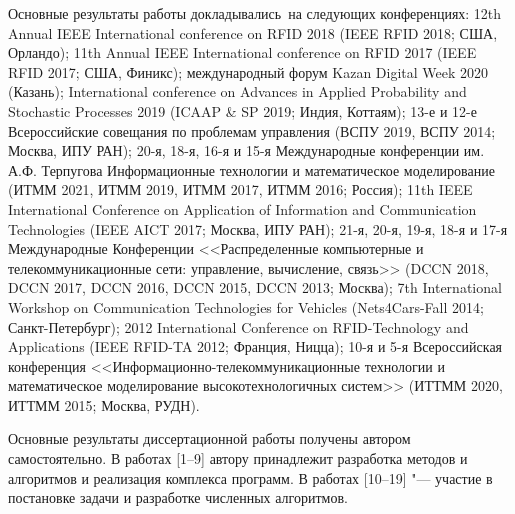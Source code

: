 {\probation}
Основные результаты работы докладывались~на следующих конференциях: 12th Annual IEEE International conference on RFID 2018 (IEEE RFID 2018; США, Орландо); 11th Annual IEEE International conference on RFID 2017 (IEEE RFID 2017; США, Финикс); международный форум Kazan Digital Week 2020 (Казань); International conference on Advances in Applied Probability and Stochastic Processes 2019 (ICAAP \& SP 2019; Индия, Коттаям); 13-е и 12-е Всероссийские совещания по проблемам управления (ВСПУ 2019, ВСПУ 2014; Москва, ИПУ РАН); 20-я, 18-я, 16-я и 15-я Международные конференции им. А.Ф. Терпугова Информационные технологии и математическое моделирование (ИТММ 2021, ИТММ 2019, ИТММ 2017, ИТММ 2016; Россия); 11th IEEE International Conference on Application of Information and Communication Technologies (IEEE AICT 2017; Москва, ИПУ РАН); 21-я, 20-я, 19-я, 18-я и 17-я Международные Конференции <<Распределенные компьютерные и телекоммуникационные сети: управление, вычисление, связь>> (DCCN 2018, DCCN 2017, DCCN 2016, DCCN 2015, DCCN 2013; Москва); 7th International Workshop on Communication Technologies for Vehicles (Nets4Cars-Fall 2014; Санкт-Петербург); 2012 International Conference on RFID-Technology and Applications (IEEE RFID-TA 2012; Франция, Ницца); 10-я и 5-я Всероссийская конференция <<Информационно-телекоммуникационные технологии и математическое моделирование высокотехнологичных систем>> (ИТТММ 2020, ИТТММ 2015; Москва, РУДН).

{\contribution} Основные результаты диссертационной работы получены автором самостоятельно. В работах [1--9] автору принадлежит разработка методов и алгоритмов и реализация комплекса программ. В работах [10--19] "--- участие в постановке задачи и разработке численных алгоритмов.

